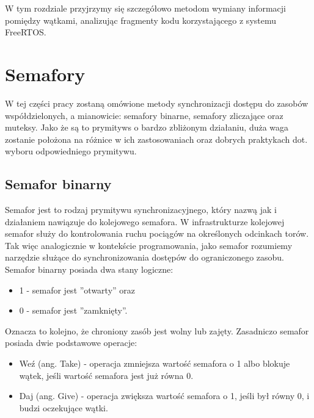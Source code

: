 W tym rozdziale przyjrzymy się szczegółowo metodom wymiany informacji pomiędzy wątkami,
analizując fragmenty kodu korzystającego z systemu FreeRTOS.

\section{Semafory}
W tej części pracy zostaną omówione metody synchronizacji dostępu do zasobów współdzielonych, a mianowicie: semafory binarne, semafory zliczające
oraz muteksy. Jako że są to
\glspl{prymityw} o bardzo zbliżonym działaniu, duża waga zostanie położona na różnice w ich zastosowaniach
oraz dobrych praktykach dot. wyboru odpowiedniego prymitywu.

\subsection{Semafor binarny}
Semafor jest to rodzaj prymitywu synchronizacyjnego, który nazwą jak i działaniem nawiązuje do kolejowego semafora. W infrastrukturze kolejowej
semafor służy do kontrolowania ruchu pociągów na określonych odcinkach torów. Tak więc analogicznie w kontekście programowania, jako semafor rozumiemy
narzędzie służące do synchronizowania dostępów do ograniczonego zasobu\cite{shaw1991real}. Semafor binarny posiada dwa stany logiczne:
\begin{itemize}
    \item 1 - semafor jest ''otwarty'' oraz
    \item 0 - semafor jest ''zamknięty''.
\end{itemize}
Oznacza to kolejno, że chroniony zasób jest wolny lub zajęty.
Zasadniczo semafor posiada dwie podstawowe operacje:
\begin{itemize}
    \item Weź (ang. Take) - operacja zmniejsza wartość semafora o 1 albo blokuje wątek, jeśli wartość semafora jest już równa 0.
    \item Daj (ang. Give) - operacja zwiększa wartość semafora o 1, jeśli był równy 0, i budzi oczekujące wątki.
\end{itemize}

